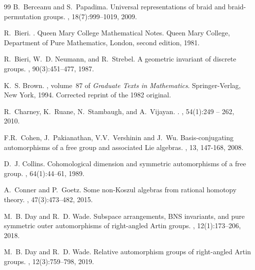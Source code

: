 \documentclass[10pt]{amsart}
\theoremstyle{definition}
\theoremstyle{definition}
\numberwithin{equation}{section}
\begin{document}

\begin{thebibliography}{99}
B.~Berceanu and S.~Papadima.
\newblock Universal representations of braid and braid-permutation groups.
, 18(7):999--1019, 2009.

R.~Bieri.
.
\newblock Queen Mary College Mathematical Notes. Queen Mary College, Department
  of Pure Mathematics, London, second edition, 1981.

R.~Bieri, W.~D. Neumann, and R.~Strebel.
\newblock A geometric invariant of discrete groups.
, 90(3):451--477, 1987.

K.~S. Brown.
, volume~87 of {\em Graduate Texts in
  Mathematics}.
\newblock Springer-Verlag, New York, 1994.
\newblock Corrected reprint of the 1982 original.

R.~Charney, K.~Ruane, N.~Stambaugh, and A.~Vijayan.
.
, 54(1):249 -- 262, 2010.

F.R.~Cohen, J.~Pakianathan, V.V.~Vershinin and J.~Wu.
\newblock  Basis-conjugating automorphisms of a free group and associated Lie algebras.
, 13, 147-168, 2008.


D.~J. Collins.
\newblock Cohomological dimension and symmetric automorphisms of a free group.
, 64(1):44--61, 1989.

A.~Conner and P.~Goetz.
\newblock Some {non-Koszul} algebras from rational homotopy theory.
, 47(3):473--482,
  2015.


M.~B. Day and R.~D. Wade.
\newblock Subspace arrangements, {BNS} invariants, and pure symmetric outer
  automorphisms of right-angled {A}rtin groups.
, 12(1):173--206, 2018.


M.~B. Day and R.~D. Wade.
\newblock Relative automorphism groups of right-angled {Artin} groups.
, 12(3):759--798, 2019.


\end{thebibliography}
\end{document}

